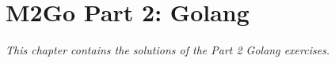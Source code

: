 \chapter{M2Go Part 2: Golang}
\label{cha:golang}
\textit{This chapter contains the solutions of the Part 2 Golang exercises.}






